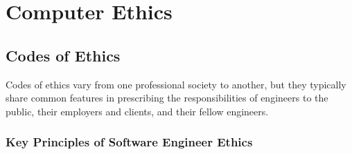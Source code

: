 \chapter{Computer Ethics}

\section{Codes of Ethics}
Codes of ethics vary from one professional society to another, but they typically share common features in prescribing the responsibilities of engineers to the public, their employers and clients, and their fellow engineers.

\subsection{Key Principles of Software Engineer Ethics}
